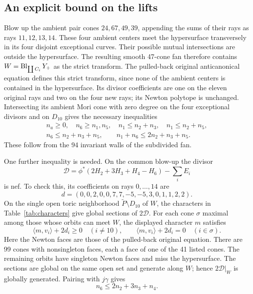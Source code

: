 \subsection{An explicit bound on the lifts}
Blow up the ambient pair cones $24,67,49,39$, appending the sums of
their rays as rays $11,12,13,14$. These four ambient centers meet
the hypersurface transversely in its four disjoint exceptional
curves. Their possible mutual intersections are outside the
hypersurface. The resulting smooth 47-cone fan therefore contains
$W=\operatorname{Bl}_{\coprod C_i}Y_+$ as the strict transform. The pulled-back
original anticanonical equation defines this strict transform, since
none of the ambient centers is contained in the hypersurface. Its
divisor coefficients are one on the eleven original rays and two
on the four new rays; its Newton polytope is unchanged.
Intersecting its ambient Mori cone with zero degree on the four
exceptional divisors and on $D_{10}$ gives the necessary inequalities
\begin{equation}\label{eq:outer}
 \begin{gathered}
 n_a\ge0,\quad n_6\ge n_1,n_5,\quad
 n_1\le n_2+n_3,\quad n_1\le n_2+n_5,\\
 n_6\le n_2+n_3+n_5,\qquad
 n_1+n_6\le2n_2+n_3+n_5.
 \end{gathered}
\end{equation}
These follow from the 94 invariant walls of the subdivided fan.

One further inequality is needed. On the common blow-up the divisor
\[
 \mathcal D=\phi^*(2H_2+3H_3+H_4-H_6)-\sum_i E_i
\]
is nef. To check this, its coefficients on rays $0,\ldots,14$ are
\[
 d=(0,0,2,0,0,7,7,-5,-5,3,0,1,1,2,2).
\]
On the single open toric neighborhood $\widetilde P\setminus D_{10}$
of $W$, the characters in Table~\ref{tab:characters} give global
sections of $2\mathcal D$. For each cone $\sigma$ maximal among those
whose orbits can meet $W$, the displayed character $m$ satisfies
\[
 \langle m,v_i\rangle+2d_i\ge0\quad(i\ne10),\qquad
 \langle m,v_i\rangle+2d_i=0\quad(i\in\sigma).
\]
Here the Newton faces are those of the pulled-back original equation.
There are 99 cones with nonsingleton faces, each a face of one of the
41 listed cones. The remaining orbits have singleton Newton faces
and miss the hypersurface. The sections are global on the same open
set and generate along $W$; hence $2\mathcal D|_W$ is globally
generated. Pairing with $j\gamma$ gives
\begin{equation}\label{eq:last-bound}
 n_6\le2n_2+3n_3+n_4.
\end{equation}

